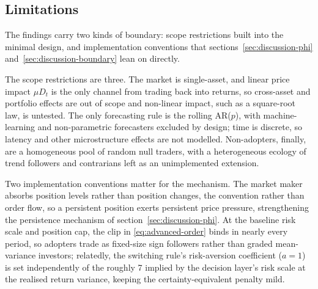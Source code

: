 \documentclass[12pt]{article}
\begin{document}
\subsection{Limitations}\label{sec:limitations}

The findings carry two kinds of boundary: scope restrictions built into the minimal design, and implementation conventions that sections~\ref{sec:discussion-phi} and~\ref{sec:discussion-boundary} lean on directly.

The scope restrictions are three.
The market is single-asset, and linear price impact $\mu D_t$ is the only channel from trading back into returns, so cross-asset and portfolio effects are out of scope and non-linear impact, such as a square-root law, is untested. %
The only forecasting rule is the rolling AR($p$), with machine-learning and non-parametric forecasters excluded by design; time is discrete, so latency and other microstructure effects are not modelled. %
Non-adopters, finally, are a homogeneous pool of random null traders, with a heterogeneous ecology of trend followers and contrarians left as an unimplemented extension. %

Two implementation conventions matter for the mechanism.
The market maker absorbs position levels rather than position changes, the \citet{beja1980} convention rather than \citet{farmerjoshi2002} order flow, so a persistent position exerts persistent price pressure, strengthening the persistence mechanism of section~\ref{sec:discussion-phi}. %
At the baseline risk scale and position cap, the clip in \eqref{eq:advanced-order} binds in nearly every period, so adopters trade as fixed-size sign followers rather than graded mean-variance investors; relatedly, the switching rule's risk-aversion coefficient ($a=1$) is set independently of the roughly 7 implied by the decision layer's risk scale at the realised return variance, keeping the certainty-equivalent penalty mild. %
\end{document}
